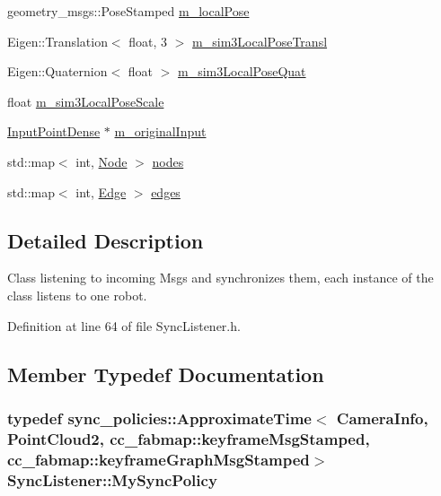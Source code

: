 \begin{DoxyCompactItemize}
geometry\-\_\-msgs\-::\-Pose\-Stamped \hyperlink{classSyncListener_a17fb054f6825f7b44eeab7467938ac81}{m\-\_\-local\-Pose}
\item 
\-Eigen\-::\-Translation$<$ float, 3 $>$ \hyperlink{classSyncListener_a1dc58db5a86d88a47fdad97920a31d4c}{m\-\_\-sim3\-Local\-Pose\-Transl}
\item 
\-Eigen\-::\-Quaternion$<$ float $>$ \hyperlink{classSyncListener_ab56ff407af05f490da548a5e7150a726}{m\-\_\-sim3\-Local\-Pose\-Quat}
\item 
float \hyperlink{classSyncListener_aaf3e2d41bade5563773335eb7dcea484}{m\-\_\-sim3\-Local\-Pose\-Scale}
\item 
\hyperlink{structInputPointDense}{\-Input\-Point\-Dense} $\ast$ \hyperlink{classSyncListener_a143bf4683b219a962032a3b711820850}{m\-\_\-original\-Input}
\item 
std\-::map$<$ int, \hyperlink{classNode}{\-Node} $>$ \hyperlink{classSyncListener_a8f72710aa41f9f4b48c23ac1d5f37e23}{nodes}
\item 
std\-::map$<$ int, \hyperlink{classEdge}{\-Edge} $>$ \hyperlink{classSyncListener_a681672fb8569101a794d8c7d8a8c1448}{edges}
\end{DoxyCompactItemize}


\subsection{\-Detailed \-Description}
\-Class listening to incoming \-Msgs and synchronizes them, each instance of the class listens to one robot. 

\-Definition at line 64 of file \-Sync\-Listener.\-h.



\subsection{\-Member \-Typedef \-Documentation}
\hypertarget{classSyncListener_aff51e417f521f074342bc0344856d01e}{
\subsubsection[{\-My\-Sync\-Policy}]{\setlength{\rightskip}{0pt plus 5cm}typedef sync\-\_\-policies\-::\-Approximate\-Time$<$ \-Camera\-Info, \-Point\-Cloud2, cc\-\_\-fabmap\-::keyframe\-Msg\-Stamped, cc\-\_\-fabmap\-::keyframe\-Graph\-Msg\-Stamped$>$ {\bf \-Sync\-Listener\-::\-My\-Sync\-Policy}}}\label{classSyncListener_aff51e417f521f074342bc0344856d01e}


